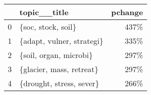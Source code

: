 \begin{tabular}{llr}
\toprule
{} &               topic\_\_title &  pchange \\
\midrule
0 &         \{soc, stock, soil\} &     437\% \\
1 &  \{adapt, vulner, strategi\} &     335\% \\
2 &     \{soil, organ, microbi\} &     297\% \\
3 &   \{glacier, mass, retreat\} &     297\% \\
4 &   \{drought, stress, sever\} &     266\% \\
\bottomrule
\end{tabular}
